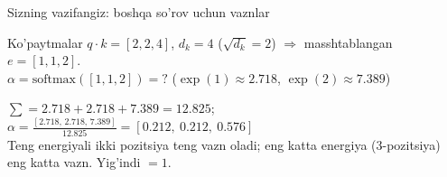\documentclass[aspectratio=169,11pt]{beamer}
\begin{document}
\begin{frame}{Sizning vazifangiz: boshqa so'rov uchun vaznlar}
  \begin{tcolorbox}[warnbox,title=Savol --- 90 soniya]
    \small
    Ko'paytmalar $q\cdot k = [2, 2, 4]$, $d_k=4$ ($\sqrt{d_k}=2$) $\Rightarrow$
    masshtablangan $e=[1, 1, 2]$.\\[4pt]
    \textbf{\large $\alpha = \mathrm{softmax}([1,1,2]) = ?$} \quad
    \footnotesize ($\exp(1){\approx}2.718$, $\exp(2){\approx}7.389$)
  \end{tcolorbox}
  \pause
  \begin{tcolorbox}[okbox,title=Javob]
    \small
    $\textstyle\sum = 2.718+2.718+7.389 = 12.825$;\quad
    $\alpha = \tfrac{[2.718,\,2.718,\,7.389]}{12.825} = \mathbf{[0.212,\ 0.212,\ 0.576]}$\\[3pt]
    \footnotesize Teng energiyali ikki pozitsiya teng vazn oladi; eng katta
    energiya (3-pozitsiya) eng katta vazn. Yig'indi $=1$.
  \end{tcolorbox}
\end{frame}
\end{document}
